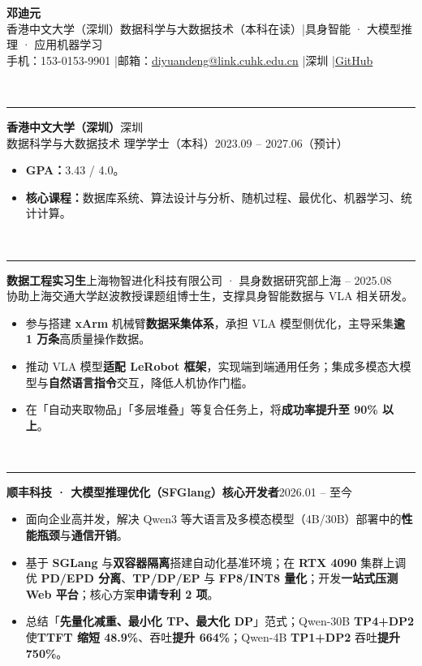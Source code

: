 \documentclass[10pt,letterpaper]{article}
\newcommand{\Github}{https://github.com/aCm1T}
\newcommand{\cvsec}[1]{%
  \par\addvspace{0.36em}%
  \noindent{\large\bfseries #1}\\[-0.22em]%
  {\color{black!45}\rule{\linewidth}{0.4pt}}%
  \par\addvspace{0.16em}%
}
\begin{document}
\raggedright

\begin{center}
  {\LARGE\bfseries 邓迪元}\\[0.12em]
  {\small 香港中文大学（深圳）\quad 数据科学与大数据技术（本科在读）\quad|\quad 具身智能 · 大模型推理 · 应用机器学习}\\[0.18em]
  \footnotesize
  手机：153-0153-9901 \quad|\quad 邮箱：\href{mailto:diyuandeng@link.cuhk.edu.cn}{diyuandeng@link.cuhk.edu.cn} \quad|\quad 深圳 \quad|\quad \href{\Github}{GitHub}
\end{center}
\vspace{0.06em}

\cvsec{教育经历}
\textbf{香港中文大学（深圳）}\hfill{\normalsize 深圳}\\
数据科学与大数据技术 \quad 理学学士（本科）\hfill{\normalsize 2023.09 -- 2027.06（预计）}
\begin{itemize}
  \item \textbf{GPA：}3.43 / 4.0。
  \item \textbf{核心课程：}数据库系统、算法设计与分析、随机过程、最优化、机器学习、统计计算。
\end{itemize}

\cvsec{实习经历}
\textbf{数据工程实习生}\quad 上海物智进化科技有限公司 · 具身数据研究部\hfill{\normalsize 上海 -- 2025.08}\\
协助上海交通大学赵波教授课题组博士生，支撑具身智能数据与 VLA 相关研发。
\begin{itemize}
  \item 参与搭建 \textbf{xArm} 机械臂\textbf{数据采集体系}，承担 VLA 模型侧优化，主导采集\textbf{逾 1 万条}高质量操作数据。
  \item 推动 VLA 模型\textbf{适配 LeRobot 框架}，实现端到端通用任务；集成多模态大模型与\textbf{自然语言指令}交互，降低人机协作门槛。
  \item 在「自动夹取物品」「多层堆叠」等复合任务上，将\textbf{成功率提升至 90\% 以上}。
\end{itemize}

\cvsec{项目与研究}
\textbf{顺丰科技 · 大模型推理优化（SFGlang）}\quad\textbf{核心开发者}\hfill{\normalsize 2026.01 -- 至今}
\begin{itemize}
  \item 面向企业高并发，解决 Qwen3 等大语言及多模态模型（4B/30B）部署中的\textbf{性能瓶颈}与\textbf{通信开销}。
  \item 基于 \textbf{SGLang} 与\textbf{双容器隔离}搭建自动化基准环境；在 \textbf{RTX 4090} 集群上调优 \textbf{PD/EPD 分离}、\textbf{TP/DP/EP} 与 \textbf{FP8/INT8 量化}；开发\textbf{一站式压测 Web 平台}；核心方案\textbf{申请专利 2 项}。
  \item 总结「\textbf{先量化减重、最小化 TP、最大化 DP}」范式；Qwen-30B \textbf{TP4+DP2} 使\textbf{TTFT 缩短 48.9\%}、吞吐\textbf{提升 664\%}；Qwen-4B \textbf{TP1+DP2} 吞吐\textbf{提升 750\%}。
\end{itemize}
\end{document}
